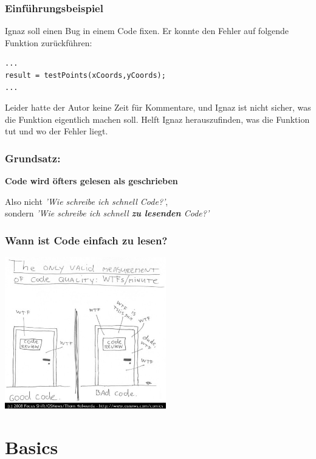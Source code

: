 \documentclass[handout]{beamer}
\begin{document}
\begin{frame}[fragile]
    \frametitle{Einführungsbeispiel}
    Ignaz soll einen Bug in einem Code fixen. Er konnte den Fehler auf folgende
    Funktion zurückführen:
\begin{lstlisting}
...
result = testPoints(xCoords,yCoords);
...
\end{lstlisting}
Leider hatte der Autor keine Zeit für Kommentare, und Ignaz ist nicht sicher,
was die Funktion eigentlich machen soll. Helft Ignaz herauszufinden,
was die Funktion  tut und wo der Fehler liegt.
\end{frame}

\begin{frame}
    \frametitle{Grundsatz:}
    \begin{center}
        \huge \bf Code wird öfters gelesen als geschrieben
    \end{center}
    \vspace{2em}\pause
    Also nicht \textit{'Wie schreibe ich schnell Code?'}, \\
    sondern \textit{'Wie schreibe ich schnell \textbf{zu lesenden} Code?'}
\end{frame}

\begin{frame}
    \frametitle{Wann ist Code einfach zu lesen?}
    \begin{center}
        \includegraphics[width=7cm]{wtfm.jpg}
    \end{center}
\end{frame}

\section{Basics}
\begin{frame}
    \tableofcontents[currentsection]
\end{frame}
\end{document}
